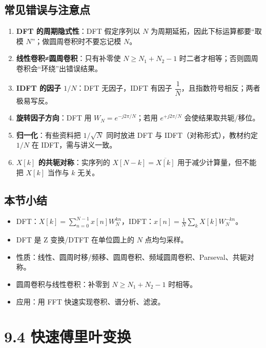 \subsection{常见错误与注意点}\label{ux5e38ux89c1ux9519ux8befux4e0eux6ce8ux610fux70b9-27}

\begin{enumerate}
\def\labelenumi{\arabic{enumi}.}
\tightlist
\item
  \textbf{DFT 的周期隐式性}：DFT 假定序列以 \(N\)
  为周期延拓，因此下标运算都要``取模 \(N\)''；做圆周卷积时不要忘记模
  \(N\)。
\item
  \textbf{线性卷积≠圆周卷积}：只有补零使 \(N\ge N_1+N_2-1\)
  时二者才相等；否则圆周卷积会``环绕''出错误结果。
\item
  \textbf{IDFT 的因子 \(1/N\)}：DFT 无因子，IDFT 有因子
  \(\dfrac{1}{N}\)，且指数符号相反；两者极易写反。
\item
  \textbf{旋转因子方向}：DFT 用 \(W_N=e^{-j2\pi/N}\)；若用
  \(e^{+j2\pi/N}\) 会使结果取共轭/移位。
\item
  \textbf{归一化}：有些资料把 \(1/\sqrt{N}\) 同时放进 DFT 与
  IDFT（对称形式），教材约定 \(1/N\) 在 IDFT，需与讲义一致。
\item
  \textbf{\(X[k]\) 的共轭对称}：实序列的 \(X[N-k]=\overline{X[k]}\)
  用于减少计算量，但不能把 \(X[k]\) 当作与 \(k\) 无关。
\end{enumerate}

\subsection{本节小结}\label{ux672cux8282ux5c0fux7ed3-27}

\begin{itemize}
\tightlist
\item
  DFT：\(X[k]=\sum_{n=0}^{N-1}x[n]W_N^{kn}\)，IDFT：\(x[n]=\frac1N\sum_k X[k]W_N^{-kn}\)。
\item
  DFT 是 Z 变换/DTFT 在单位圆上的 \(N\) 点均匀采样。
\item
  性质：线性、圆周时移/频移、圆周卷积、频域圆周卷积、Parseval、共轭对称。
\item
  圆周卷积与线性卷积：补零到 \(N\ge N_1+N_2-1\) 时相等。
\item
  应用：用 FFT 快速实现卷积、谱分析、滤波。
\end{itemize}

\section{9.4
快速傅里叶变换}\label{ux5febux901fux5085ux91ccux53f6ux53d8ux6362}

